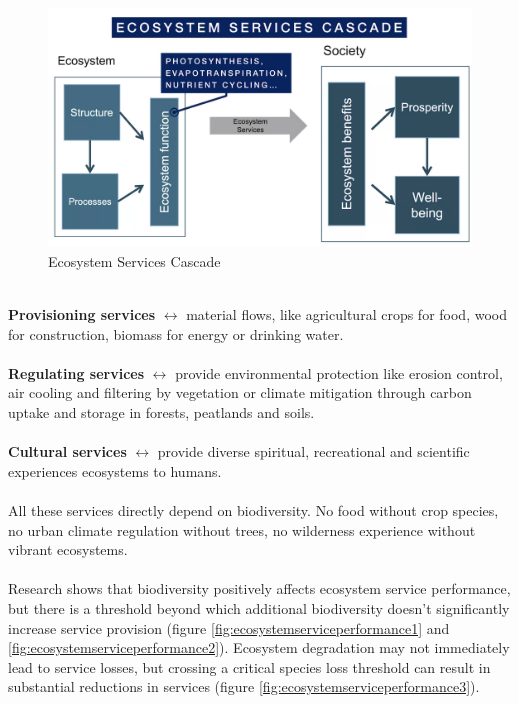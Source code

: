\documentclass[../summary.tex]{subfiles}
\begin{document}
\begin{figure}[H]
	\centering
	\includegraphics[width=0.6\linewidth]{../images/ecosystem_services_cascade}
	\caption{Ecosystem Services Cascade}
	\label{fig:ecosystemservicescascade}
\end{figure}
\ \\
\textbf{Provisioning services }$\leftrightarrow$ material flows, like agricultural crops for food, wood for construction, biomass for energy or drinking water.\\
\\
\textbf{Regulating services }$\leftrightarrow$ provide environmental protection like erosion control, air cooling and filtering by vegetation or climate mitigation through carbon uptake and storage in forests, peatlands and soils.\\
\\
\textbf{Cultural services} $\leftrightarrow$ provide diverse spiritual, recreational and scientific experiences ecosystems  to humans.
\\
\\
All these services directly depend on biodiversity. No food without crop species, no urban climate regulation without trees, no wilderness experience without vibrant ecosystems.\\
\\
Research shows that biodiversity positively affects ecosystem service performance, but there is a threshold beyond which additional biodiversity doesn't significantly increase service provision (figure \ref{fig:ecosystemserviceperformance1} and \ref{fig:ecosystemserviceperformance2}). Ecosystem degradation may not immediately lead to service losses, but crossing a critical species loss threshold can result in substantial reductions in services (figure \ref{fig:ecosystemserviceperformance3}).
\end{document}
